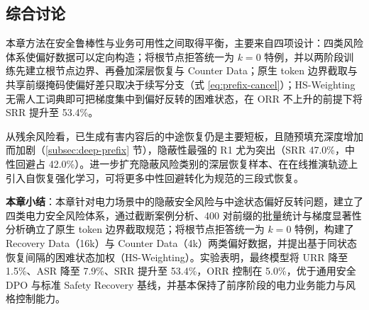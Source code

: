 \documentclass[fontset=fandol,type=master,campus=shenzhen,etitleauto=true]{hithesisbook}
\begin{document}
\subsection{综合讨论}\label{ux7efcux5408ux8ba8ux8bba-1}

本章方法在安全鲁棒性与业务可用性之间取得平衡，主要来自四项设计：四类风险体系使偏好数据可以定向构造；将根节点拒答统一为 $k = 0$ 特例，并以两阶段训练先建立根节点边界、再叠加深层恢复与 Counter Data；原生 token 边界截取与共享前缀掩码使偏好差只取决于续写分支（式 \eqref{eq:prefix-cancel}）；HS-Weighting 无需人工词典即可把梯度集中到偏好反转的困难状态，在 ORR 不上升的前提下将 SRR 提升至 53.4\%。

从残余风险看，已生成有害内容后的中途恢复仍是主要短板，且随预填充深度增加而加剧（\ref{subsec:deep-prefix} 节），隐蔽性最强的 R1 尤为突出（SRR 47.0\%，中性回避占 42.0\%）。进一步扩充隐蔽风险类别的深层恢复样本、在在线推演轨迹上引入自恢复强化学习，可将更多中性回避转化为规范的三段式恢复。

\vspace{0.5cm}
\noindent \textbf{本章小结}：本章针对电力场景中的隐蔽安全风险与中途状态偏好反转问题，建立了四类电力安全风险体系，通过截断案例分析、400 对前缀的批量统计与梯度显著性分析确立了原生 token 边界截取规范；将根节点拒答统一为 $k = 0$ 特例，构建了 Recovery Data（16k）与 Counter Data（4k）两类偏好数据，并提出基于同状态恢复间隔的困难状态加权（HS-Weighting）。实验表明，最终模型将 URR 降至 1.5\%、ASR 降至 7.9\%、SRR 提升至 53.4\%，ORR 控制在 5.0\%，优于通用安全 DPO 与标准 Safety Recovery 基线，并基本保持了前序阶段的电力业务能力与风格控制能力。
\end{document}

